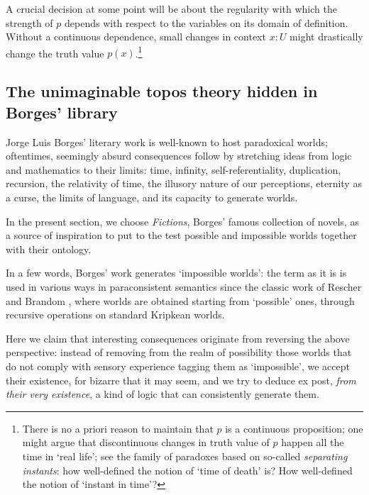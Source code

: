 A crucial decision at some point will be about the regularity with which the strength of $p$ depends with respect to the variables on its domain of definition. Without a continuous dependence, small changes in context $x : U$ might drastically change the truth value $p(x)$.\footnote{There is no a priori reason to maintain that $p$ is a continuous proposition; one might argue that discontinuous changes in truth value of $p$ happen all the time in `real life'; see the family of paradoxes based on so-called \emph{separating instants}: how well-defined the notion of `time of death' is? How well-defined the notion of `instant in time'?}
\subsection{The unimaginable topos theory hidden in Borges' library}
Jorge Luis Borges' literary work is well-known to host paradoxical worlds; oftentimes, seemingly absurd consequences follow by stretching ideas from logic and mathematics to their limits: time, infinity, self-referentiality, duplication, recursion, the relativity of time, the illusory nature of our perceptions, eternity as a curse, the limits of language, and its capacity to generate worlds.

In the present section, we choose \emph{Fictions}, Borges' famous collection of novels, as a source of inspiration to put to the test possible and impossible worlds together with their ontology.

In a few words, Borges' work generates `impossible worlds': the term as it is is used in various ways in paraconsistent semantics since the classic work of Rescher and Brandom \cite{10.2307/20127724}, where worlds are obtained starting from `possible' ones, through recursive operations on standard Kripkean worlds.

Here we claim that interesting consequences originate from reversing the above perspective: instead of removing from the realm of possibility those worlds that do not comply with sensory experience tagging them as `impossible', we accept their existence, for bizarre that it may seem, and we try to deduce ex post, \emph{from their very existence}, a kind of logic that can consistently generate them.

